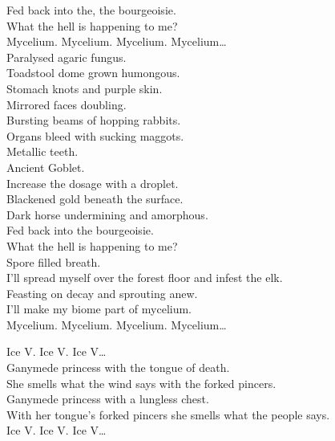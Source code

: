 Fed back into the, the bourgeoisie. \\
What the hell is happening to me? \\

Mycelium. Mycelium. Mycelium. Mycelium… \\

Paralysed agaric fungus. \\
Toadstool dome grown humongous. \\
Stomach knots and purple skin. \\
Mirrored faces doubling. \\
Bursting beams of hopping rabbits. \\
Organs bleed with sucking maggots. \\
Metallic teeth. \\
Ancient Goblet. \\
Increase the dosage with a droplet. \\
Blackened gold beneath the surface. \\
Dark horse undermining and amorphous. \\
Fed back into the bourgeoisie. \\
What the hell is happening to me? \\
Spore filled breath. \\
I'll spread myself over the forest floor and infest the elk. \\
Feasting on decay and sprouting anew. \\
I'll make my biome part of mycelium. \\

Mycelium. Mycelium. Mycelium. Mycelium… \\




Ice V. Ice V. Ice V… \\

Ganymede princess with the tongue of death. \\
She smells what the wind says with the  forked pincers. \\
Ganymede princess with a lungless chest. \\
With her tongue's forked pincers she smells what the people says. \\

Ice V. Ice V. Ice V… \\

